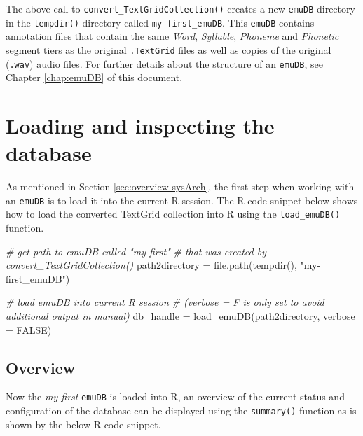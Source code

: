 \documentclass[
]{book}
\newenvironment{Shaded}{\begin{snugshade}}{\end{snugshade}}
\newcommand{\AttributeTok}[1]{\textcolor[rgb]{0.77,0.63,0.00}{#1}}
\newcommand{\CommentTok}[1]{\textcolor[rgb]{0.56,0.35,0.01}{\textit{#1}}}
\newcommand{\ConstantTok}[1]{\textcolor[rgb]{0.00,0.00,0.00}{#1}}
\newcommand{\FunctionTok}[1]{\textcolor[rgb]{0.00,0.00,0.00}{#1}}
\newcommand{\NormalTok}[1]{#1}
\newcommand{\OtherTok}[1]{\textcolor[rgb]{0.56,0.35,0.01}{#1}}
\newcommand{\StringTok}[1]{\textcolor[rgb]{0.31,0.60,0.02}{#1}}
\begin{document}
The above call to \texttt{convert\_TextGridCollection()} creates a new \texttt{emuDB} directory in the \texttt{tempdir()} directory called \texttt{my-first\_emuDB}. This \texttt{emuDB} contains annotation files that contain the same \emph{Word}, \emph{Syllable}, \emph{Phoneme} and \emph{Phonetic} segment tiers as the original \texttt{.TextGrid} files as well as copies of the original (\texttt{.wav}) audio files. For further details about the structure of an \texttt{emuDB}, see Chapter \ref{chap:emuDB} of this document.

\hypertarget{loading-and-inspecting-the-database}{%
\section{Loading and inspecting the database}\label{loading-and-inspecting-the-database}}

As mentioned in Section \ref{sec:overview-sysArch}, the first step when working with an \texttt{emuDB} is to load it into the current R session. The R code snippet below shows how to load the converted TextGrid collection into R using the \texttt{load\_emuDB()} function.

\begin{Shaded}
\begin{Highlighting}[]
\CommentTok{\# get path to emuDB called "my{-}first"}
\CommentTok{\# that was created by convert\_TextGridCollection()}
\NormalTok{path2directory }\OtherTok{=} \FunctionTok{file.path}\NormalTok{(}\FunctionTok{tempdir}\NormalTok{(), }\StringTok{"my{-}first\_emuDB"}\NormalTok{)}

\CommentTok{\# load emuDB into current R session}
\CommentTok{\# (verbose = F is only set to avoid additional output in manual)}
\NormalTok{db\_handle }\OtherTok{=} \FunctionTok{load\_emuDB}\NormalTok{(path2directory, }
                       \AttributeTok{verbose =} \ConstantTok{FALSE}\NormalTok{)}
\end{Highlighting}
\end{Shaded}

\hypertarget{overview}{%
\subsection{Overview}\label{overview}}

Now the \emph{my-first} \texttt{emuDB} is loaded into R, an overview of the current status and configuration of the database can be displayed using the \texttt{summary()} function as is shown by the below R code snippet.
\end{document}
